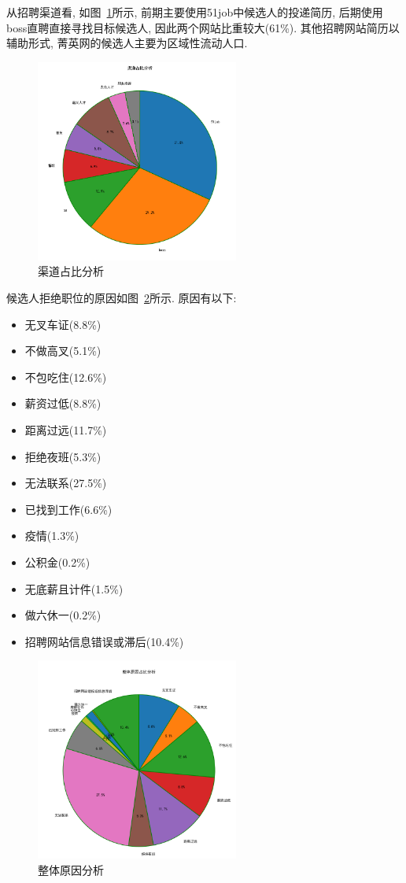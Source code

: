 从招聘渠道看, 如图~\ref{fig:0302}所示, 前期主要使用51job中候选人的投递简历, 后期使用boss直聘直接寻找目标候选人, 因此两个网站比重较大(61\%). 其他招聘网站简历以辅助形式, 菁英网的候选人主要为区域性流动人口.

\begin{figure}[htbp]
    \centering
    \includegraphics[height=18em]{pic/fig02_trim.png}
    \caption{渠道占比分析}
    \label{fig:0302}
\end{figure}

候选人拒绝职位的原因如图~\ref{fig:0303}所示. 原因有以下:
\begin{itemize}
    \item 无叉车证(8.8\%)
    \item 不做高叉(5.1\%)
    \item 不包吃住(12.6\%)
    \item 薪资过低(8.8\%)
    \item 距离过远(11.7\%)
    \item 拒绝夜班(5.3\%)
    \item 无法联系(27.5\%)
    \item 已找到工作(6.6\%)
    \item 疫情(1.3\%)
    \item 公积金(0.2\%)
    \item 无底薪且计件(1.5\%)
    \item 做六休一(0.2\%)
    \item 招聘网站信息错误或滞后(10.4\%)
\end{itemize}

\begin{figure}[htbp]
    \centering
    \includegraphics[height=18em]{pic/fig03_trim.png}
    \caption{整体原因分析}
    \label{fig:0303}
\end{figure}

